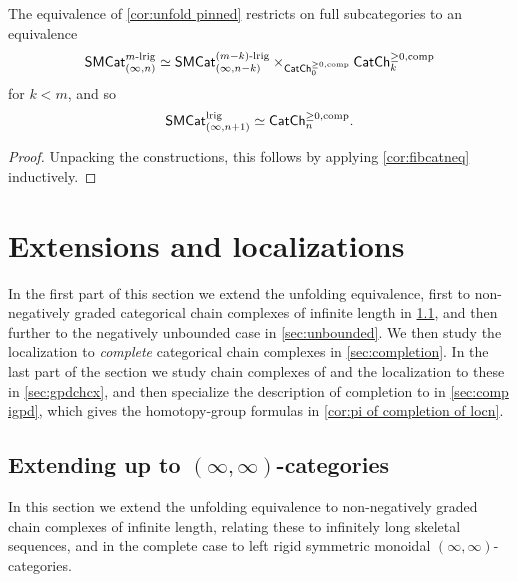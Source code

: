 \documentclass[a4paper,11pt]{article}
\begin{document}
\begin{cor}\label{cor:finite complete unfolding}
  The equivalence of \cref{cor:unfold pinned} restricts on full
  subcategories to an equivalence
  \[ \textup{\textsf{SMCat}}_{(\infty,n)}^{m\text{\textup{-lrig}}} \simeq
    \textup{\textsf{SMCat}}_{(\infty,n-k)}^{(m-k)\text{\textup{-lrig}}} \times_{\textup{\textsf{CatCh}}^{\geq 0,\text{\textup{comp}}}_{0}}
    \textup{\textsf{CatCh}}^{\geq 0,\text{\textup{comp}}}_{k}\]
  for $k < m$, and so
  \[ \textup{\textsf{SMCat}}_{(\infty,n+1)}^{\text{\textup{lrig}}} \simeq 
    \textup{\textsf{CatCh}}^{\geq 0,\text{\textup{comp}}}_{n}.\]
\end{cor}
\begin{proof}
  Unpacking the constructions, this follows by applying
  \cref{cor:fibcatneq} inductively.
\end{proof}


\section{Extensions and localizations}
\label{sec:extend}

In the first part of this section we extend the unfolding equivalence,
first to non-negatively graded categorical chain complexes of infinite
length in \cref{sec:iicats}, and then further to the negatively
unbounded case in \cref{sec:unbounded}. We then study the localization
to \emph{complete} categorical chain complexes in
\cref{sec:completion}.
In the last part of the section we study chain complexes of \igpds{}
and the localization to these in \cref{sec:gpdchcx}, and then
specialize the description of completion to \igpds{} in \cref{sec:comp
  igpd}, which gives the homotopy-group formulas in
\cref{cor:pi of completion of locn}.

\subsection{Extending up to $(\infty,\infty)$-categories}
\label{sec:iicats}

In this section we extend the unfolding equivalence to non-negatively
graded chain complexes of infinite length, relating these to
infinitely long skeletal sequences, and in the complete case to left
rigid symmetric monoidal $(\infty,\infty)$-categories.
\end{document}
